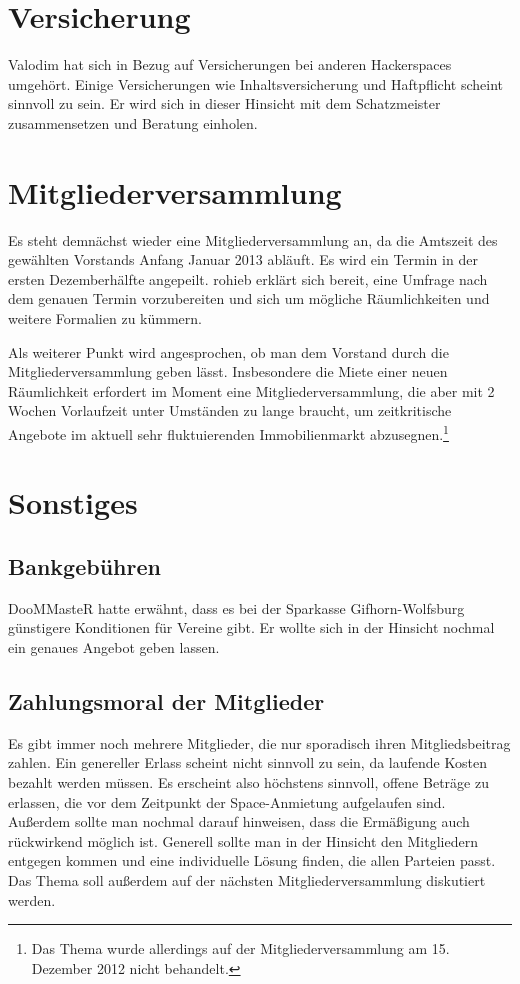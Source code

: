 \documentclass[a4paper,12pt]{scrartcl}
\begin{document}
\section{Versicherung}
Valodim hat sich in Bezug auf Versicherungen bei anderen Hackerspaces umgehört.
Einige Versicherungen wie Inhaltsversicherung und Haftpflicht scheint sinnvoll
zu sein. Er wird sich in dieser Hinsicht mit dem Schatzmeister zusammensetzen
und Beratung einholen.

\section{Mitgliederversammlung}
Es steht demnächst wieder eine Mitgliederversammlung an, da die Amtszeit des
gewählten Vorstands Anfang Januar 2013 abläuft. Es wird ein Termin in der ersten
Dezemberhälfte angepeilt. rohieb erklärt sich bereit, eine Umfrage nach dem
genauen Termin vorzubereiten und sich um mögliche Räumlichkeiten und weitere
Formalien zu kümmern.

Als weiterer Punkt wird angesprochen, ob man dem Vorstand durch die
Mitgliederversammlung geben lässt. Insbesondere die Miete einer neuen
Räumlichkeit erfordert im Moment eine Mitgliederversammlung, die aber mit 2
Wochen Vorlaufzeit unter Umständen zu lange braucht, um zeitkritische Angebote
im aktuell sehr fluktuierenden Immobilienmarkt abzusegnen.\footnote{Das Thema
wurde allerdings auf der Mitgliederversammlung am 15. Dezember 2012 nicht
behandelt.}

\section{Sonstiges}
\subsection{Bankgebühren}
DooMMasteR hatte erwähnt, dass es bei der Sparkasse Gifhorn-Wolfsburg günstigere
Konditionen für Vereine gibt. Er wollte sich in der Hinsicht nochmal ein genaues
Angebot geben lassen.

\subsection{Zahlungsmoral der Mitglieder}
Es gibt immer noch mehrere Mitglieder, die nur sporadisch ihren Mitgliedsbeitrag
zahlen. Ein genereller Erlass scheint nicht sinnvoll zu sein, da laufende Kosten
bezahlt werden müssen. Es erscheint also höchstens sinnvoll, offene Beträge zu
erlassen, die vor dem Zeitpunkt der Space-Anmietung aufgelaufen sind. Außerdem
sollte man nochmal darauf hinweisen, dass die Ermäßigung auch rückwirkend
möglich ist.  Generell sollte man in der Hinsicht den Mitgliedern entgegen
kommen und eine individuelle Lösung finden, die allen Parteien passt. Das Thema
soll außerdem auf der nächsten Mitgliederversammlung diskutiert werden.
\end{document}
